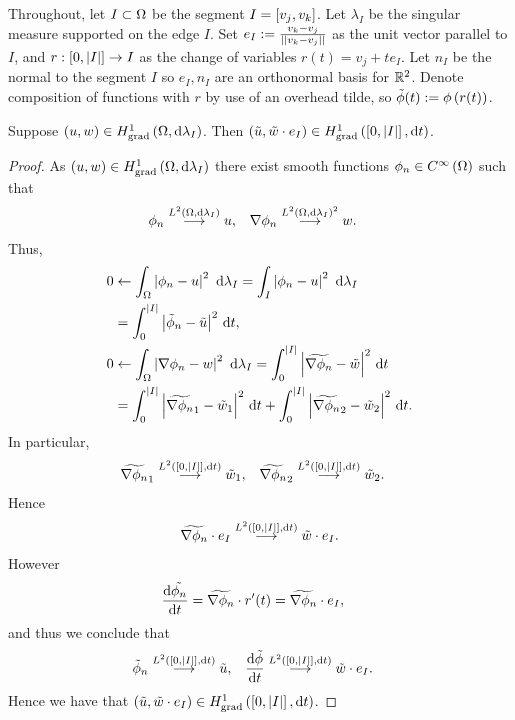 \documentclass[11pt]{report}
\begin{document}
Throughout, let $I\subset\Omega$ be the segment $I=\left[ v_j,v_k \right]$.
Let $\lambda_I$ be the singular measure supported on the edge $I$.
Set $e_I := \frac{v_k-v_j}{\lvert\lvert v_k-v_j \rvert\rvert}$ as the unit vector parallel to $I$, and $r:\left[ 0,\left\lvert I \right\rvert \right]\rightarrow I$ as the change of variables $r(t) = v_j + te_I$.
Let $n_I$ be the normal to the segment $I$ so $e_I, n_I$ are an orthonormal basis for $\mathbb{R}^2$.
Denote composition of functions with $r$ by use of an overhead tilde, so $\tilde{\phi}(t) := \phi\left( r(t) \right)$. \newline

\begin{lemma} \label{lem:SingularSobSpaceImpliesIntervalSobSpace}
	Suppose $\left( u,w \right)\in H^1_\mathrm{grad}\left( \Omega, \mathrm{d}\lambda_I \right)$.
	Then $\left( \tilde{u},\tilde{w}\cdot e_I \right)\in H^1_\mathrm{grad}\left( \left[ 0,\left\lvert I \right\rvert \right], \mathrm{d}t \right)$.
\end{lemma}
\begin{proof}
	As $\left( u,w \right)\in H^1_\mathrm{grad}\left( \Omega, \mathrm{d}\lambda_I \right)$ there exist smooth functions $\phi_n\in C^{\infty}\left( \Omega \right)$ such that
	\begin{align*}
		\phi_n \overset{L^{2}\left( \Omega,\mathrm{d}\lambda_I \right)}{\longrightarrow} u, &\quad \nabla\phi_n \overset{L^{2}\left( \Omega,\mathrm{d}\lambda_I \right)^2}{\longrightarrow} w.
	\end{align*}
	Thus,
	\begin{align*}
		0 &\leftarrow \integral{\ddom}{\abs{\phi_n - u}^2}{\lambda_I}
		= \integral{I}{\abs{\phi_n - u}^2}{\lambda_I} \\
		&= \int_0^{\abs{I}}{\abs{\tilde{\phi}_n - \tilde{u}}^2} \ \md t, \\
		0 &\leftarrow \integral{\ddom}{\abs{\grad\phi_n - w}^2}{\lambda_I}
		= \int_0^{\abs{I}}{\abs{\widetilde{\grad\phi_n} - \tilde{w}}^2} \ \md t \\
		&= \int_0^{\abs{I}}{\abs{\widetilde{\grad\phi_n}_1 - \tilde{w}_1}^2} \ \md t + \int_0^{\abs{I}}{\abs{\widetilde{\grad\phi_n}_2 - \tilde{w}_2}^2} \ \md t.
	\end{align*}
	In particular,
	\begin{align*}
		\widetilde{\nabla\phi_n}_1 \overset{L^{2}\left( \left[ 0,\left\lvert I \right\rvert \right],\mathrm{d}t \right)}{\longrightarrow} \tilde{w}_1, 
		&\quad \widetilde{\nabla\phi_n}_2 \overset{L^{2}\left( \left[ 0,\left\lvert I \right\rvert \right],\mathrm{d}t \right)}{\longrightarrow} \tilde{w}_2.
	\end{align*}
	Hence
	\begin{align*}
		\widetilde{\nabla\phi_n}\cdot e_I \overset{L^{2}\left( \left[ 0,\left\lvert I \right\rvert \right],\mathrm{d}t \right)}{\longrightarrow} \tilde{w}\cdot e_I.
	\end{align*}
	However
	\begin{align*}
		\dfrac{\mathrm{d}\tilde{\phi_n}}{\mathrm{d}t} &= \widetilde{\nabla\phi_n}\cdot r'(t)
		= \widetilde{\nabla\phi_n}\cdot e_I,
	\end{align*}
	and thus we conclude that
	\begin{align*}
		\tilde{\phi}_n \overset{L^{2}\left( \left[ 0,\left\lvert I \right\rvert \right],\mathrm{d}t \right)}{\longrightarrow} \tilde{u}, 
		&\quad \dfrac{\mathrm{d}\tilde{\phi}}{\mathrm{d}t} \overset{L^{2}\left( \left[ 0,\left\lvert I \right\rvert \right],\mathrm{d}t \right)}{\longrightarrow} \tilde{w}\cdot e_I.
	\end{align*}
	Hence we have that $\left( \tilde{u}, \tilde{w}\cdot e_I \right)\in H^1_\mathrm{grad}\left( \left[ 0,\left\lvert I \right\rvert \right], \mathrm{d}t \right)$.
\end{proof}
\end{document}
